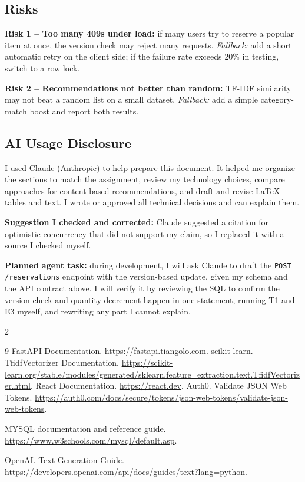 \documentclass[11pt]{article}
\begin{document}
\subsection*{Risks}
\textbf{Risk 1 -- Too many 409s under load:} if many users try to reserve a popular item at once,
the version check may reject many requests. \emph{Fallback:} add a short automatic retry on the
client side; if the failure rate exceeds 20\% in testing, switch to a row lock.

\textbf{Risk 2 -- Recommendations not better than random:} TF-IDF similarity may not beat a
random list on a small dataset. \emph{Fallback:} add a simple category-match boost and report both
results.

\subsection*{AI Usage Disclosure}
I used Claude (Anthropic) to help prepare this document. It helped me organize the sections to
match the assignment, review my technology choices, compare approaches for content-based
recommendations, and draft and revise LaTeX tables and text. I wrote or approved all technical
decisions and can explain them.

\textbf{Suggestion I checked and corrected:} Claude suggested a citation for optimistic concurrency
that did not support my claim, so I replaced it with a source I checked myself.

\textbf{Planned agent task:} during development, I will ask Claude to draft the
\texttt{POST /reservations} endpoint with the version-based update, given my schema and the API
contract above. I will verify it by reviewing the SQL to confirm the version check and quantity
decrement happen in one statement, running T1 and E3 myself, and rewriting any part I cannot
explain.

\begin{multicols}{2}\footnotesize
\begin{thebibliography}{9}\setlength{\itemsep}{1pt}
 FastAPI Documentation. \url{https://fastapi.tiangolo.com}.
 scikit-learn. TfidfVectorizer Documentation. \url{https://scikit-learn.org/stable/modules/generated/sklearn.feature_extraction.text.TfidfVectorizer.html}.
 React Documentation. \url{https://react.dev}.
 Auth0. Validate JSON Web Tokens. \url{https://auth0.com/docs/secure/tokens/json-web-tokens/validate-json-web-tokens}.

  MYSQL documentation and reference guide. \url{https://www.w3schools.com/mysql/default.asp}.

 OpenAI. Text Generation Guide. \url{https://developers.openai.com/api/docs/guides/text?lang=python}.
\end{thebibliography}
\end{multicols}
\end{document}
